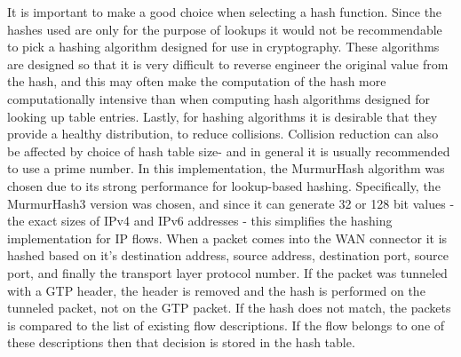 It is important to make a good choice when selecting a hash function. Since the hashes used are only for the purpose of lookups it would not be recommendable to pick a hashing algorithm designed for use in cryptography. These algorithms are designed so that it is very difficult to reverse engineer the original value from the hash, and this may often make the computation of the hash more computationally intensive than when computing hash algorithms designed for looking up table entries. Lastly, for hashing algorithms it is desirable that they provide a healthy distribution, to reduce collisions. Collision reduction can also be affected by choice of hash table size- and in general it is usually recommended to use a prime number. In this implementation, the MurmurHash algorithm was chosen due to its strong performance for lookup-based hashing. Specifically, the MurmurHash3 \cite{appleby2012murmurhash3} version was chosen, and since it can generate 32 or 128 bit values - the exact sizes of IPv4 and IPv6 addresses - this simplifies the hashing implementation for IP flows. When a packet comes into the WAN connector it is hashed based on it's destination address, source address, destination port, source port, and finally the transport layer protocol number. If the packet was tunneled with a GTP header, the header is removed and the hash is performed on the tunneled packet, not on the GTP packet. If the hash does not match, the packets is compared to the list of existing flow descriptions. If the flow belongs to one of these descriptions then that decision is stored in the hash table.






























